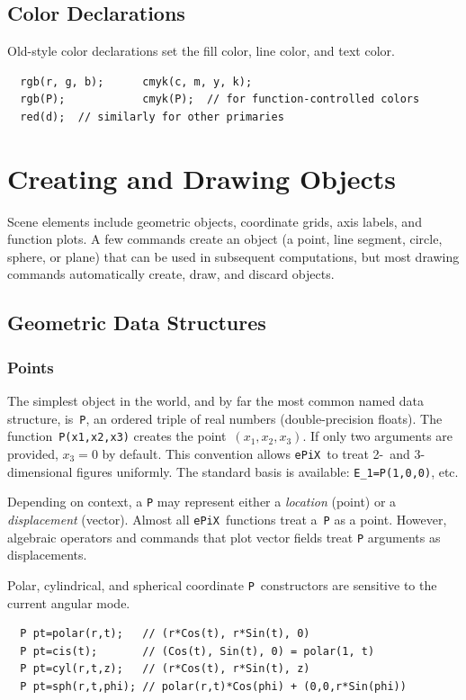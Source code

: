 \documentclass[12pt,letterpaper]{book}
\newcommand{\code}[1]{\texttt{#1}}
\newcommand{\ePiX}{\code{ePiX}}
\newcommand{\teximath}[1]{$#1$}
\newcommand{\findex}[1]{\ignorespaces}
\begin{document}
\subsection{Color Declarations}

Old-style color declarations set the fill color, line color, and
text color.
\findex{rgb}
\findex{cmyk}
\begin{verbatim}
  rgb(r, g, b);      cmyk(c, m, y, k);
  rgb(P);            cmyk(P);  // for function-controlled colors
  red(d);  // similarly for other primaries
\end{verbatim}


\section{Creating and Drawing Objects}

Scene elements include geometric objects, coordinate grids, axis
labels, and function plots. A few commands create an object (a point,
line segment, circle, sphere, or plane) that can be used in subsequent
computations, but most drawing commands automatically create, draw,
and discard objects.


\subsection{Geometric Data Structures}

\subsubsection*{Points}
The simplest object in the world, and by far the most common named
data structure, is~\code{P}, an ordered triple of real numbers
(double-precision floats). The function~\code{P(x1,x2,x3)} creates the
point~\teximath{(x_1,x_2,x_3)}. If only two arguments are provided,
\teximath{x_3=0} by default. This convention allows \ePiX\ to treat
2-~and 3-dimensional figures uniformly. The standard basis is
available: \code{E\_1=P(1,0,0)}, etc. 

Depending on context, a \code{P} may represent either a
\emph{location} (point) or a \emph{displacement} (vector). Almost all
\ePiX\ functions treat a~\code{P} as a point. However, algebraic
operators and commands that plot vector fields treat \code{P}
arguments as displacements.

Polar, cylindrical, and spherical coordinate \code{P}~constructors are
sensitive to the current angular mode. 
\findex{P}
\findex{polar}
\findex{cis}
\findex{cyl}
\findex{sph}
\begin{verbatim}
  P pt=polar(r,t);   // (r*Cos(t), r*Sin(t), 0)
  P pt=cis(t);       // (Cos(t), Sin(t), 0) = polar(1, t)
  P pt=cyl(r,t,z);   // (r*Cos(t), r*Sin(t), z)
  P pt=sph(r,t,phi); // polar(r,t)*Cos(phi) + (0,0,r*Sin(phi))
\end{verbatim}
\end{document}
